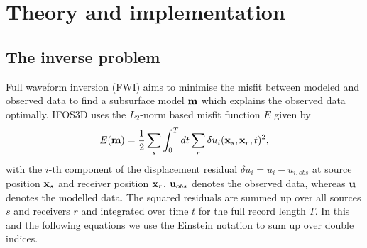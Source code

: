 \chapter{Theory and implementation}
\section{The inverse problem}
Full waveform inversion (FWI) aims to minimise the misfit between modeled and observed data to find a subsurface model $\textbf m$ which explains the observed data optimally. IFOS3D uses the $L_2$-norm based misfit function $E$ given by 
\begin{equation}E(\textbf m)=\frac{1}{2}\sum_{s}\int_0^T dt \sum_{r}\delta u_i(\textbf x_s,\textbf x_r,t)^2, \label{eq:L2}\end{equation}
with the $i$-th component of the displacement residual $\delta u_i=u_i-u_{i,obs}$ at source position $\textbf x_s$ and receiver position $\textbf x_r$. $\textbf u_{obs}$ denotes the observed data, whereas $\textbf u$ denotes the modelled data. The squared residuals are summed up over all sources $s$ and receivers $r$ and integrated over time $t$ for the full record length $T$. In this and the following equations we use the Einstein notation to sum up over double indices.
